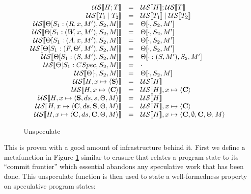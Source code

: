 \begin{figure}
\begin{displaymath}
\begin{array}{rcll}
\mathcal{US} \llbracket H; T \rrbracket &=& \mathcal{US} \llbracket H \rrbracket; \mathcal{US} \llbracket T \rrbracket \\
\mathcal{US} \llbracket T_1 \; | \; T_2 \rrbracket &=& \mathcal{US} \llbracket T_1 \rrbracket \; | \; \mathcal{US} \llbracket T_2 \rrbracket \\
\mathcal{US} \llbracket \Theta[S_1 : (R, x, M'), S_2, M] \rrbracket &=& \Theta[\cdot, S_2,M'] \\
\mathcal{US} \llbracket \Theta[S_1 : (W, x, M'), S_2,M] \rrbracket &=& \Theta[\cdot, S_2,M'] \\
\mathcal{US} \llbracket \Theta[S_1 : (A, x, M'), S_2,M] \rrbracket &=& \Theta[\cdot, S_2,M'] \\
\mathcal{US} \llbracket \Theta[S_1 : (F, \Theta', M'), S_2,M] \rrbracket &=& \Theta[\cdot, S_2,M'] \\
\mathcal{US} \llbracket \Theta[S_1 : (S, M'), S_2,M] \rrbracket &=& \Theta[\cdot : (S, M'), S_2, M'] \\
\mathcal{US} \llbracket \Theta[S_1 : CSpec, S_2,M] \rrbracket &=& \cdot \\
\mathcal{US} \llbracket \Theta[\cdot, S_2, M] \rrbracket &=& \Theta[\cdot, S_2, M]\\
\mathcal{US} \llbracket H, x \mapsto \langle \text{\bf S} \rangle \rrbracket &=& \mathcal{US} \llbracket H \rrbracket \\
\mathcal{US} \llbracket H, x \mapsto \langle \text{\bf C} \rangle \rrbracket &=& \mathcal{US} \llbracket H \rrbracket, x\mapsto \langle \text{\bf C} \rangle \\
\mathcal{US} \llbracket H, x \mapsto \langle \text{\bf S}, ds, s, \Theta, M\rangle \rrbracket &=& \mathcal{US} \llbracket H \rrbracket \\
\mathcal{US} \llbracket H, x\mapsto \langle \text{\bf C}, ds, \text{\bf S}, \Theta, M\rangle \rrbracket &=& \mathcal{US} \llbracket H \rrbracket, x \mapsto \langle \text{\bf C} \rangle \\
\mathcal{US} \llbracket H, x \mapsto \langle \text{\bf C}, ds, \text{\bf C}, \Theta, M\rangle \rrbracket &=& \mathcal{US} \llbracket H \rrbracket, x \mapsto \langle \text{\bf C}, \emptyset, \text{\bf C}, \Theta, M\rangle \\
\end{array}
\end{displaymath}
\caption{Unspeculate}
\label{fig:unspec}
\end{figure}

This is proven with a good amount of infrastructure behind it.  First we define a metafunction in Figure \ref{fig:unspec} similar to erasure that relates a program state to its ``commit frontier'' which essential abandons any speculative work that has been done.  This unspeculate function is then used to state a well-formedness property on speculative program states:

